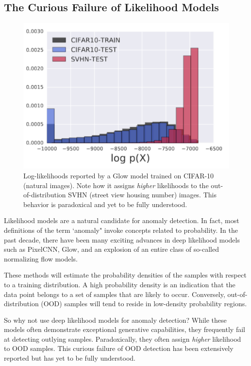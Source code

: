 \subsection*{The Curious Failure of Likelihood Models}

\begin{figure}[tbhp]
    \centering
    \includegraphics[width=.6\textwidth]{figures/cifar_glow_nalisnick.png}
    \caption{Log-likelihoods reported by a Glow model trained on CIFAR-10 (natural images). Note how it assigns \textit{higher} likelihoods to the out-of-distribution SVHN (street view housing number) images. This behavior is paradoxical and yet to be fully understood.}
    \label{fig:cifar_glow}
\end{figure}

Likelihood models are a natural candidate for anomaly detection. In fact, most definitions of the term `anomaly" invoke concepts related to probability. In the past decade, there have been many exciting advances in deep likelihood models such as PixelCNN, Glow, and an explosion of an entire class of so-called normalizing flow models.

These methods will estimate the probability densities of the samples with respect to a training distribution. A high probability density is an indication that the data point belongs to a set of samples that are likely to occur.
Conversely, out-of-distribution (OOD) samples will tend to reside in low-density probability regions.


So why not use deep likelihood models for anomaly detection? While these models often demonstrate exceptional generative capabilities, they frequently fail at detecting outlying samples. Paradoxically, they often assign \textit{higher} likelihood to OOD samples. This curious failure of OOD detection has been extensively reported \cite{nalisnick2018do,why_norm_fails,nalisnick2020detecting} but has yet to be fully understood.

